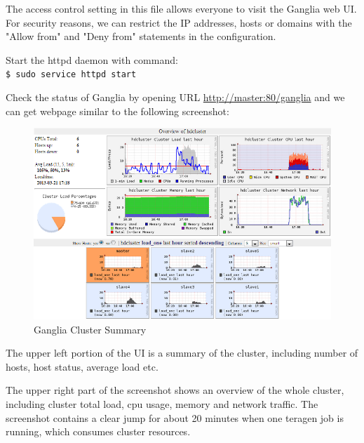 The access control setting in this file allows everyone to visit the Ganglia web UI. For security reasons, we can restrict the IP addresses, hosts or domains with the "Allow from" and "Deny from" statements in the configuration.

Start the httpd daemon with command: \\
\verb|$ sudo service httpd start|

Check the status of Ganglia by opening URL \url{http://master:80/ganglia} and we can get webpage similar to the following screenshot: \\
\begin{figure}[h]
  \centering
  \includegraphics[width=.8\textwidth]{figs/5163os_06_06.png}
  \caption{Ganglia Cluster Summary}\label{fig:ganglia.cluster.summary}
\end{figure} 


The upper left portion of the UI is a summary of the cluster, including number of hosts, host status, average load etc.

The upper right part of the screenshot shows an overview of the whole cluster, including cluster total load, cpu usage, memory and network traffic. The screenshot contains a clear jump for about 20 minutes when one teragen job is running, which consumes cluster resources.

